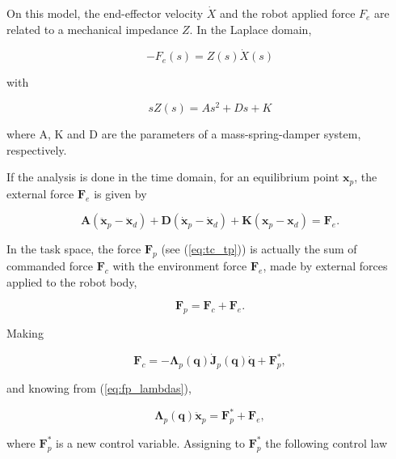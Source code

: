 On this model, the end-effector velocity $\dot{X}$ and the robot applied force $F_e$ are related to a mechanical impedance $Z$. In the Laplace domain,

\begin{equation}
    \label{eq:impedance_and_force}
    -F_e(s) = Z(s) \dot{X}(s)
\end{equation}

with

\begin{equation}
    \label{eq:impedance_model}
    sZ(s) = As^2 + Ds + K
\end{equation}

where A, K and D are the parameters of a mass-spring-damper system, respectively.

If the analysis is done in the time domain, for an equilibrium point $\boldsymbol{x}_p$, the external force $\boldsymbol{F}_e$ is given by

\begin{equation}
    \label{eq:impedance_time_domain}
    \boldsymbol{A}(\boldsymbol{\ddot{x}}_p - \boldsymbol{\ddot{x}}_d)+\boldsymbol{D}(\boldsymbol{\dot{x}}_p - \boldsymbol{\dot{x}}_d) + \boldsymbol{K}(\boldsymbol{x}_p - \boldsymbol{x}_d) = \boldsymbol{F}_e.
\end{equation}

In the task space, the force $\boldsymbol{F}_p$ (see (\ref{eq:tc_tp})) is actually the sum of commanded force $\boldsymbol{F}_c$ with the environment force $\boldsymbol{F}_e$, made by external forces applied to the robot body, 

\begin{equation}
    \boldsymbol{F}_p = \boldsymbol{F}_c + \boldsymbol{F}_e.
\end{equation}

Making 

\begin{equation}
    \boldsymbol{F}_c = -\boldsymbol{\Lambda}_p(\boldsymbol{q}) \boldsymbol{\dot{J}}_p(\boldsymbol{q}) \boldsymbol{\dot{q}} + \boldsymbol{F}^*_p ,
\end{equation}

and knowing from (\ref{eq:fp_lambdas}), 

\begin{equation}
    \boldsymbol{\Lambda}_p(\boldsymbol{q}) \boldsymbol{\ddot{x}}_p = \boldsymbol{F}^*_p + \boldsymbol{F}_e,
\end{equation}

where $\boldsymbol{F}^*_p$ is a new control variable. Assigning to $\boldsymbol{F}^*_p$ the following control law 

